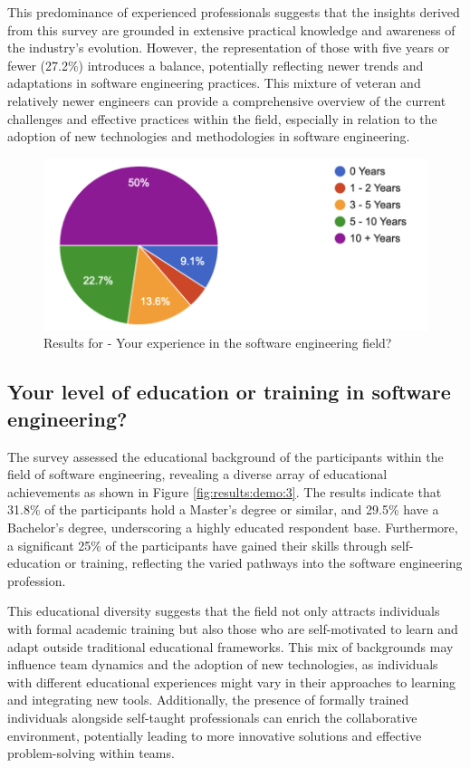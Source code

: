 This predominance of experienced professionals suggests that the insights derived from this survey are grounded in extensive practical knowledge and awareness of the industry's evolution. However, the representation of those with five years or fewer (27.2\%) introduces a balance, potentially reflecting newer trends and adaptations in software engineering practices. This mixture of veteran and relatively newer engineers can provide a comprehensive overview of the current challenges and effective practices within the field, especially in relation to the adoption of new technologies and methodologies in software engineering.

\begin{figure}[h!]
\centering
\includegraphics[width=\linewidth]{Images/Survey/demo_2.png}
\caption{Results for - Your experience in the software engineering field?}
\label{fig:results:demo:2}
\end{figure}

\pagebreak

\subsection*{Your level of education or training in software engineering?}
The survey assessed the educational background of the participants within the field of software engineering, revealing a diverse array of educational achievements as shown in Figure \ref{fig:results:demo:3}. The results indicate that 31.8\% of the participants hold a Master's degree or similar, and 29.5\% have a Bachelor's degree, underscoring a highly educated respondent base. Furthermore, a significant 25\% of the participants have gained their skills through self-education or training, reflecting the varied pathways into the software engineering profession.

This educational diversity suggests that the field not only attracts individuals with formal academic training but also those who are self-motivated to learn and adapt outside traditional educational frameworks. This mix of backgrounds may influence team dynamics and the adoption of new technologies, as individuals with different educational experiences might vary in their approaches to learning and integrating new tools. Additionally, the presence of formally trained individuals alongside self-taught professionals can enrich the collaborative environment, potentially leading to more innovative solutions and effective problem-solving within teams.


